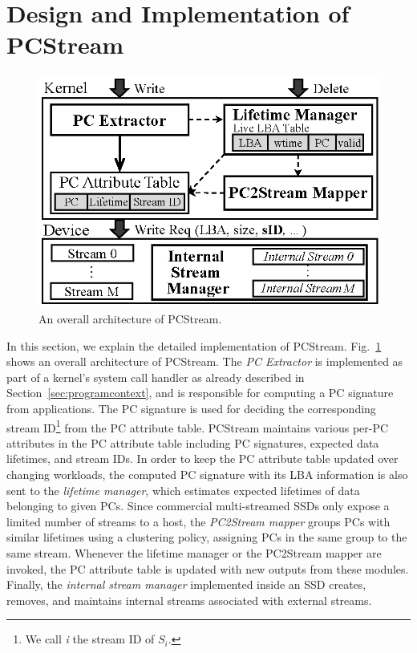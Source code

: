 \vspace{-10pt}
\section{Design and Implementation of \textsf{PCStream}}
\vspace{-5pt}

\begin{figure}[t]
	\centering
	\includegraphics[width=0.7\linewidth]{figure/overview_1}
	\vspace{-9pt}
	\caption{An overall architecture of \textsf{\small PCStream}.}
	\label{fig:architecture}
	\vspace{-15pt}
\end{figure}


In this section, we explain the detailed implementation of \textsf{\small
PCStream}.  Fig.~\ref{fig:architecture} shows an overall architecture of
\textsf{\small PCStream}. The \textit{PC Extractor} is implemented as
part of a kernel's system call handler as already described in
Section~\ref{sec:programcontext}, and is responsible for computing a PC signature
from applications.  
The PC signature is used for deciding the corresponding stream ID\footnote{
We call {\it i} the stream ID of $S_i$.} from the PC attribute table.
\textsf{\small PCStream} maintains various per-PC attributes in the PC attribute table
including PC signatures, expected data lifetimes, and stream IDs.
In order to keep the PC attribute table updated over changing workloads,
the computed PC signature with its LBA information is also sent to the 
{\it lifetime manager}, which 
estimates expected lifetimes of data belonging to given PCs.
Since commercial multi-streamed SSDs only expose a limited number of streams to a host, 
the \textit{PC2Stream mapper} groups PCs with similar lifetimes using a clustering
policy, assigning PCs in the same group to the same stream.  
Whenever the lifetime manager or the PC2Stream mapper are invoked,
the PC attribute table is updated with new outputs from these modules.
Finally, the
\textit{internal stream manager} implemented inside an SSD creates, removes,
and maintains internal streams associated with external streams.

